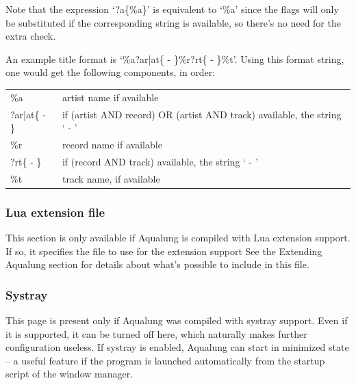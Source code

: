 \documentclass[10pt,english]{article}
\begin{document}
Note that the expression `?a\{\%a\}' is equivalent to
`\%a' since the flags will only be substituted if the
corresponding string is available, so there's no need for the
extra check.




An example title format is `\%a?ar|at\{ - \}\%r?rt\{ -
\}\%t'. Using this format string, one would get the following
components, in order:


\begin{center}\begin{tabular}{ll}

\%a&
artist name if available
\\

?ar|at\{ - \}&
if (artist AND record) OR (artist AND track) available, the string ` - '
\\

\%r&
record name if available
\\

?rt\{ - \}&
if (record AND track) available, the string ` - '
\\

\%t&
track name, if available
\\
\end{tabular}\end{center}



\subsubsection{Lua extension file\label{idp834896}}



\noindent This section is only available if Aqualung is compiled
with Lua extension support.  If so, it specifies the 
file to use for the extension support  See the Extending
Aqualung section for details about what's possible to
include in this file.




\subsubsection{Systray\label{idp836512}}



\noindent This page is present only if Aqualung was compiled with
systray support. Even if it is supported, it can be turned
off here, which naturally makes further configuration
useless. If systray is enabled, Aqualung can start in
minimized state -- a useful feature if the program is
launched automatically from the startup script of the window
manager.
\end{document}

